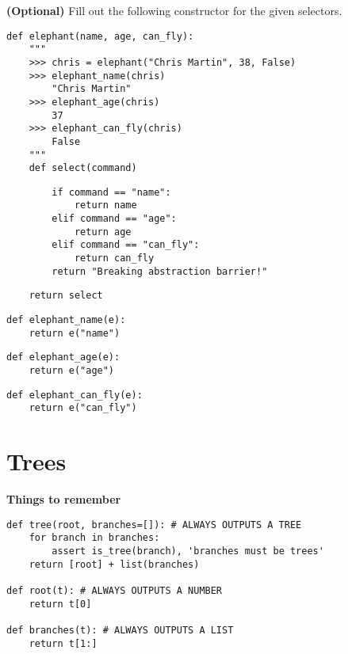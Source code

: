 \documentclass{exam}
\begin{document}
\begin{questions}
\begin{blocksection}
\end{blocksection}

\begin{blocksection}
\question \textbf{(Optional)} Fill out the following constructor for the given
selectors.

\begin{lstlisting}
def elephant(name, age, can_fly):
    """
    >>> chris = elephant("Chris Martin", 38, False)
    >>> elephant_name(chris)
        "Chris Martin"
    >>> elephant_age(chris)
        37
    >>> elephant_can_fly(chris)
        False
    """
    def select(command)
\end{lstlisting}
\begin{solution}[3in]
\begin{lstlisting}
        if command == "name":
            return name
        elif command == "age":
            return age
        elif command == "can_fly":
            return can_fly
        return "Breaking abstraction barrier!"
\end{lstlisting}
\end{solution}

\begin{lstlisting}
    return select
\end{lstlisting}

\begin{lstlisting}
def elephant_name(e):
    return e("name")
\end{lstlisting}

\begin{lstlisting}
def elephant_age(e):
    return e("age")
\end{lstlisting}

\begin{lstlisting}
def elephant_can_fly(e):
    return e("can_fly")
\end{lstlisting}

\end{blocksection}

\end{questions}

\section{Trees}
\textbf{Things to remember}
\begin{lstlisting}
def tree(root, branches=[]): # ALWAYS OUTPUTS A TREE
    for branch in branches:
        assert is_tree(branch), 'branches must be trees'
    return [root] + list(branches)

def root(t): # ALWAYS OUTPUTS A NUMBER
    return t[0]

def branches(t): # ALWAYS OUTPUTS A LIST
    return t[1:]
\end{lstlisting}
\end{document}
